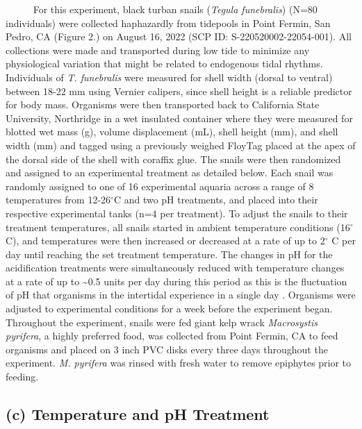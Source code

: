 \documentclass[
]{article}
\begin{document}
~~~~~ For this experiment, black turban snails
(\emph{Tegula funebralis}) (N=80 individuals) were collected haphazardly
from tidepools in Point Fermin, San Pedro, CA (Figure 2.) on August 16,
2022 (SCP ID: S-220520002-22054-001). All collections were made and
transported during low tide to minimize any physiological variation that
might be related to endogenous tidal rhythms. Individuals of
\emph{T. funebralis} were measured for shell width (dorsal to ventral)
between 18-22 mm using Vernier calipers, since shell height is a
reliable predictor for body mass. Organisms were then transported back
to California State University, Northridge in a wet insulated container
where they were measured for blotted wet mass (g), volume displacement
(mL), shell height (mm), and shell width (mm) and tagged using a
previously weighed FloyTag placed at the apex of the dorsal side of the
shell with coraffix glue. The snails were then randomized and assigned
to an experimental treatment as detailed below. Each snail was randomly
assigned to one of 16 experimental aquaria across a range of 8
temperatures from 12-26\(^\circ\)C and two pH treatments, and placed
into their respective experimental tanks (n=4 per treatment). To adjust
the snails to their treatment temperatures, all snails started in
ambient temperature conditions (16\(^\circ\)C), and temperatures were
then increased or decreased at a rate of up to 2\(^\circ\) C per day
until reaching the set treatment temperature. The changes in pH for the
acidification treatments were simultaneously reduced with temperature
changes at a rate of up to \textasciitilde0.5 units per day during this
period as this is the fluctuation of pH that organisms in the intertidal
experience in a single day \citep{jellison2016ocean}. Organisms were
adjusted to experimental conditions for a week before the experiment
began. Throughout the experiment, snails were fed giant kelp wrack
\emph{Macrosystis pyrifera}, a highly preferred food, was collected from
Point Fermin, CA to feed organisms and placed on 3 inch PVC disks every
three days throughout the experiment. \emph{M. pyrifera} was rinsed with
fresh water to remove epiphytes prior to feeding.

\hypertarget{c-temperature-and-ph-treatment}{%
\subsection{(c) Temperature and pH
Treatment}\label{c-temperature-and-ph-treatment}}
\end{document}
